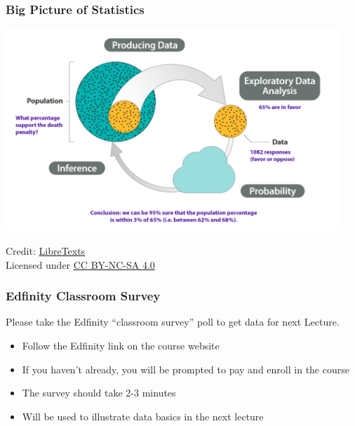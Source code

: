 \documentclass[slidestop,compress,mathserif]{beamer}
\begin{document}
\begin{frame}
    \frametitle{Big Picture of Statistics}
    \begin{center}
        \includegraphics[width=0.95\textwidth]{BigPicture2.png}
    \end{center}
    \vspace{0.5em}
    \footnotesize
    Credit: \href{https://stats.libretexts.org/Bookshelves/Applied_Statistics/Biostatistics_-_Open_Learning_Textbook/Preliminaries/The_Big_Picture}{LibreTexts}
    \\
    Licensed under \href{https://creativecommons.org/licenses/by-nc-sa/4.0/}{CC BY-NC-SA 4.0}
\end{frame}



\begin{frame}
	\frametitle{Edfinity Classroom Survey} 

	Please take the Edfinity ``classroom survey'' poll to get data for next Lecture.

	\begin{itemize}
		\item Follow the Edfinity link on the course website
		\item If you haven't already, you will be prompted to pay and enroll in the course
		\item The survey should take 2-3 minutes
		\item Will be used to illustrate data basics in the next lecture
	\end{itemize}
\end{frame}





\end{document}
